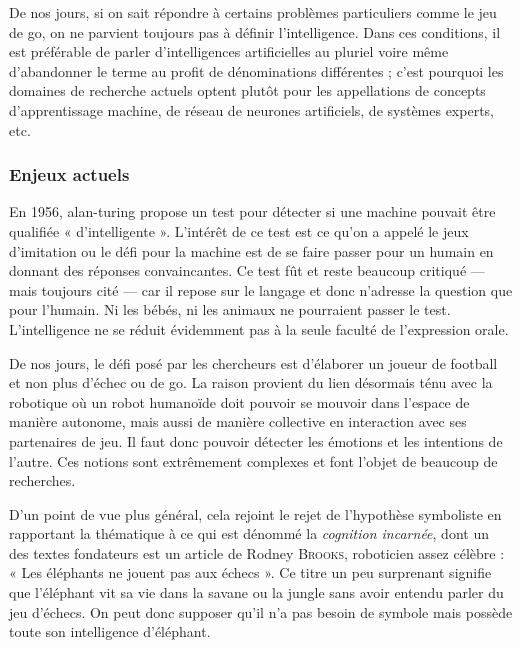 De nos jours, si on sait répondre à certains problèmes particuliers comme le jeu de go, on ne parvient toujours pas à définir l'intelligence. Dans ces conditions, il est préférable de parler d'intelligences artificielles au pluriel voire même d'abandonner le terme au profit de dénominations différentes ; c'est pourquoi les domaines de recherche actuels optent plutôt pour les appellations de concepts d'apprentissage machine, de réseau de neurones artificiels, de systèmes experts, etc.


\subsubsection[Enjeux actuels]{Enjeux actuels}
\label{subsub:III.1.1.3}

En 1956, \gls{alan-turing} propose un test pour détecter si une machine pouvait être qualifiée « d’intelligente ». L'intérêt de ce test est ce qu'on a appelé le jeux d'imitation ou le défi pour la machine est de se faire passer pour un humain en donnant des réponses convaincantes. Ce test fût et reste beaucoup critiqué --- mais toujours cité --- car il repose sur le langage et donc n'adresse la question que pour l'humain. Ni les bébés, ni les animaux ne pourraient passer le test. L'intelligence ne se réduit évidemment pas à la seule faculté de l'expression orale.

De nos jours, le défi posé par les chercheurs est d'élaborer un joueur de football et non plus d'échec ou de go. La raison provient du lien désormais ténu avec la robotique où un robot humanoïde doit pouvoir se mouvoir dans l'espace de manière autonome, mais aussi de manière collective en interaction avec ses partenaires de jeu. Il faut donc pouvoir détecter les émotions et les intentions de l'autre. Ces notions sont extrêmement complexes et font l'objet de beaucoup de recherches. 

D'un point de vue plus général, cela rejoint le rejet de l'hypothèse symboliste en rapportant la thématique à ce qui est dénommé la \emph{cognition incarnée}, dont un des textes fondateurs est un article de Rodney \textsc{Brooks}, roboticien assez célèbre : « Les éléphants ne jouent pas aux échecs ». Ce titre un peu surprenant signifie que l'éléphant vit sa vie dans la savane ou la jungle sans avoir entendu parler du jeu d'échecs. On peut donc supposer qu'il n'a pas besoin de symbole mais possède toute son intelligence d'éléphant.

